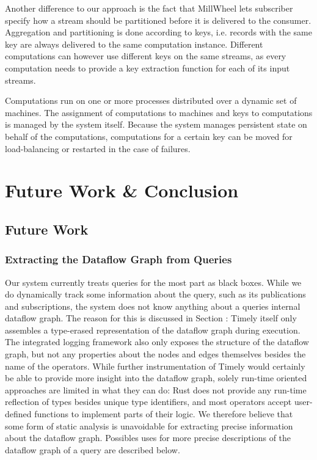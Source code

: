 Another difference to our approach is the fact that MillWheel lets subscriber
specify how a stream should be partitioned before it is delivered to the consumer.
Aggregation and partitioning is done according to keys, i.e. records with the
same key are always delivered to the same computation instance. Different
computations can however use different keys on the same streams, as every computation
needs to provide a key extraction function for each of its input streams.

Computations run on one or more processes distributed over a dynamic set of
machines. The assignment of computations to machines and keys to computations
is managed by the system itself. Because the system manages persistent state
on behalf of the computations, computations for a certain key can be moved
for load-balancing or restarted in the case of failures.

\cleardoublepage
\chapter{Future Work \& Conclusion} \label{ch:future}

\section{Future Work}

\subsection{Extracting the Dataflow Graph from Queries}

Our system currently treats queries for the most part as black boxes. While we
do dynamically track some information about the query, such as its publications
and subscriptions, the system does not know anything about a queries internal
dataflow graph. The reason for this is discussed in Section :
Timely itself only assembles a type-erased representation of the dataflow graph
during execution. The integrated logging framework also only exposes the
structure of the dataflow graph, but not any properties about the nodes and
edges themselves besides the name of the operators. While further instrumentation
of Timely would certainly be able to provide more insight into the dataflow
graph, solely run-time oriented approaches are limited in what they can do:
Rust does not provide any run-time reflection of types besides unique type
identifiers, and most operators accept user-defined functions to implement
parts of their logic. We therefore believe that some form of static analysis
is unavoidable for extracting precise information about the dataflow graph.
Possibles uses for more precise descriptions of the dataflow graph of a query
are described below.

